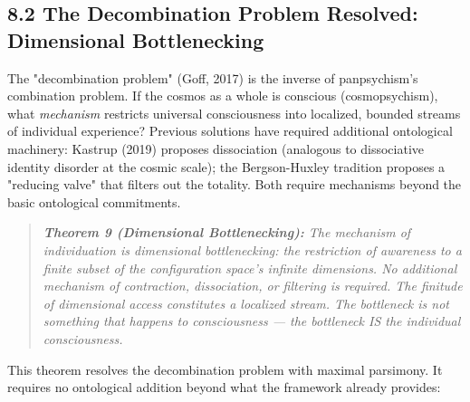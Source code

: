 \subsection*{8.2 The Decombination Problem Resolved: Dimensional Bottlenecking}


The "decombination problem" (Goff, 2017) is the inverse of panpsychism's combination problem. If the cosmos as a whole is conscious (cosmopsychism), what \textit{mechanism} restricts universal consciousness into localized, bounded streams of individual experience? Previous solutions have required additional ontological machinery: Kastrup (2019) proposes dissociation (analogous to dissociative identity disorder at the cosmic scale); the Bergson-Huxley tradition proposes a "reducing valve" that filters out the totality. Both require mechanisms beyond the basic ontological commitments.


\begin{quote}
\itshape
\textbf{Theorem 9 (Dimensional Bottlenecking):} \textit{The mechanism of individuation is dimensional bottlenecking: the restriction of awareness to a finite subset of the configuration space's infinite dimensions. No additional mechanism of contraction, dissociation, or filtering is required. The finitude of dimensional access constitutes a localized stream. The bottleneck is not something that happens to consciousness — the bottleneck IS the individual consciousness.}
\end{quote}


This theorem resolves the decombination problem with maximal parsimony. It requires no ontological addition beyond what the framework already provides:


